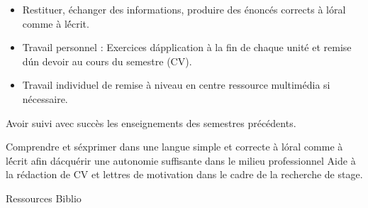 {
\begin{itemize} 
 \item Restituer, échanger des informations, produire des énoncés corrects à l\'oral comme à l\'écrit.
 \item Travail personnel : Exercices d\'application à la fin de chaque unité et remise d\'un devoir au cours du semestre (CV).
 \item Travail individuel de remise à niveau en centre ressource multimédia si nécessaire.
\end{itemize} 
} 
{Avoir suivi avec succès les enseignements des semestres précédents.
} 
{\begin{itemize} 
 \ObjItem Comprendre et s\'exprimer dans une langue simple et correcte à l\'oral comme à l\'écrit afin d\'acquérir une autonomie suffisante dans le milieu professionnel
 \ObjItem Aide à la rédaction de CV et lettres de motivation dans le cadre de la recherche de stage.
\end{itemize} 
} 
{Ressources} 
{Biblio} 
 
\vfill

